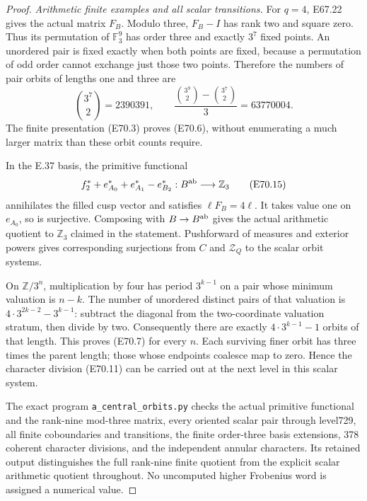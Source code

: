 \begin{proof}
\emph{Arithmetic finite examples and all scalar transitions.}
For $q=4$, E67.22 gives the actual matrix $F_B$.
Modulo three, $F_B-I$ has rank two and square
zero. Thus its permutation of $\mathbb F_3^9$
has order three and exactly $3^7$ fixed points.
An unordered pair is fixed exactly when both
points are fixed, because a permutation of
odd order cannot exchange just those two
points. Therefore the numbers of pair orbits
of lengths one and three are
\[
 \binom{3^7}{2}=2390391,\qquad
  \frac{\binom{3^9}{2}-\binom{3^7}{2}}3=63770004 .
 \tag{E70.14}
\]
The finite presentation (E70.3) proves
(E70.6), without enumerating a much larger
matrix than these orbit counts require.

In the E.37 basis, the primitive functional
\[
       f_2^*+e_{A_0}^*+e_{A_1}^*-e_{B_2}^*
           :B^{\rm ab}\longrightarrow\mathbb Z_3
 \tag{E70.15}
\]
annihilates the filled cusp vector and
satisfies $\ell F_B=4\ell$.
It takes value one on $e_{A_0}$, so is
surjective. Composing with $B\to B^{\rm ab}$
gives the actual arithmetic quotient to
$\mathbb Z_3$ claimed in the statement.
Pushforward of measures and exterior
powers gives corresponding surjections
from $C$ and $\mathcal Z_Q$ to the scalar
orbit systems.

On $\mathbb Z/3^n$, multiplication by four
has period $3^{k-1}$ on a pair whose
minimum valuation is $n-k$.
The number of unordered distinct pairs of
that valuation is
$4\cdot3^{2k-2}-3^{k-1}$: subtract the
diagonal from the two-coordinate valuation
stratum, then divide by two.
Consequently there are exactly
$4\cdot3^{k-1}-1$ orbits of that length.
This proves (E70.7) for every $n$.
Each surviving finer orbit has three times
the parent length; those whose endpoints
coalesce map to zero. Hence the character
division (E70.11) can be carried out at
the next level in this scalar system.

The exact program \texttt{a\_central\_orbits.py}
checks the actual primitive functional and
the rank-nine mod-three matrix, every
oriented scalar pair through level729,
all finite coboundaries and transitions,
the finite order-three basis extensions,
378 coherent character divisions, and
the independent annular characters.
Its retained output distinguishes the full
rank-nine finite quotient from the explicit
scalar arithmetic quotient throughout.
No uncomputed higher Frobenius word is
assigned a numerical value.
\end{proof}
